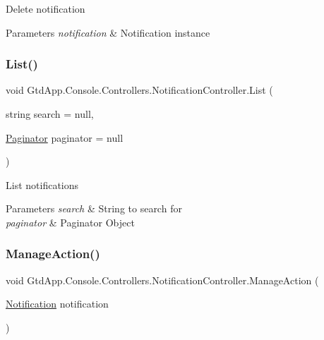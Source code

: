 Delete notification 


\begin{DoxyParams}{Parameters}
{\em notification} & Notification instance\\
\hline
\end{DoxyParams}
\mbox{\label{class_gtd_app_1_1_console_1_1_controllers_1_1_notification_controller_a170833ac57ea6ae1111fbb29e30c5201}} 
\subsubsection{\texorpdfstring{List()}{List()}}
{\footnotesize\ttfamily void Gtd\+App.\+Console.\+Controllers.\+Notification\+Controller.\+List (\begin{DoxyParamCaption}\item[{string}]{search = {\ttfamily null},  }\item[{\mbox{\hyperlink{class_gtd_app_1_1_repository_1_1_paginator}{Paginator}}}]{paginator = {\ttfamily null} }\end{DoxyParamCaption})}



List notifications 


\begin{DoxyParams}{Parameters}
{\em search} & String to search for\\
\hline
{\em paginator} & Paginator Object\\
\hline
\end{DoxyParams}
\mbox{\label{class_gtd_app_1_1_console_1_1_controllers_1_1_notification_controller_a8cd848e8facd8e4bacfb40f323238d7d}} 
\subsubsection{\texorpdfstring{Manage\+Action()}{ManageAction()}}
{\footnotesize\ttfamily void Gtd\+App.\+Console.\+Controllers.\+Notification\+Controller.\+Manage\+Action (\begin{DoxyParamCaption}\item[{\mbox{\hyperlink{class_gtd_app_1_1_data_1_1_notification}{Notification}}}]{notification }\end{DoxyParamCaption})}



